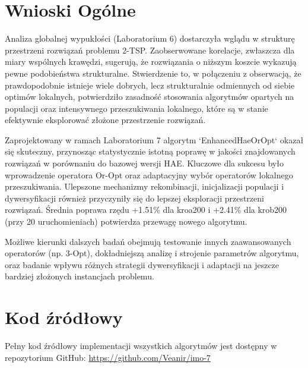 \documentclass[12pt,a4paper]{article}
\begin{document}
\section{Wnioski Ogólne}
Analiza globalnej wypukłości (Laboratorium 6) dostarczyła wglądu w strukturę przestrzeni rozwiązań problemu 2-TSP. Zaobserwowane korelacje, zwłaszcza dla miary wspólnych krawędzi, sugerują, że rozwiązania o niższym koszcie wykazują pewne podobieństwa strukturalne. Stwierdzenie to, w połączeniu z obserwacją, że prawdopodobnie istnieje wiele dobrych, lecz strukturalnie odmiennych od siebie optimów lokalnych, potwierdziło zasadność stosowania algorytmów opartych na populacji oraz intensywnego przeszukiwania lokalnego, które są w stanie efektywnie eksplorować złożone przestrzenie rozwiązań.

Zaprojektowany w ramach Laboratorium 7 algorytm `EnhancedHaeOrOpt` okazał się skuteczny, przynosząc statystycznie istotną poprawę w jakości znajdowanych rozwiązań w porównaniu do bazowej wersji HAE. Kluczowe dla sukcesu było wprowadzenie operatora Or-Opt oraz adaptacyjny wybór operatorów lokalnego przeszukiwania. Ulepszone mechanizmy rekombinacji, inicjalizacji populacji i dywersyfikacji również przyczyniły się do lepszej eksploracji przestrzeni rozwiązań. Średnia poprawa rzędu +1.51\% dla kroa200 i +2.41\% dla krob200 (przy 20 uruchomieniach) potwierdza przewagę nowego algorytmu.

Możliwe kierunki dalszych badań obejmują testowanie innych zaawansowanych operatorów (np. 3-Opt), dokładniejszą analizę i strojenie parametrów algorytmu, oraz badanie wpływu różnych strategii dywersyfikacji i adaptacji na jeszcze bardziej złożonych instancjach problemu.

\section{Kod źródłowy}
Pełny kod źródłowy implementacji wszystkich algorytmów jest dostępny w repozytorium GitHub:
\url{https://github.com/Veanir/imo-7}
\end{document}
